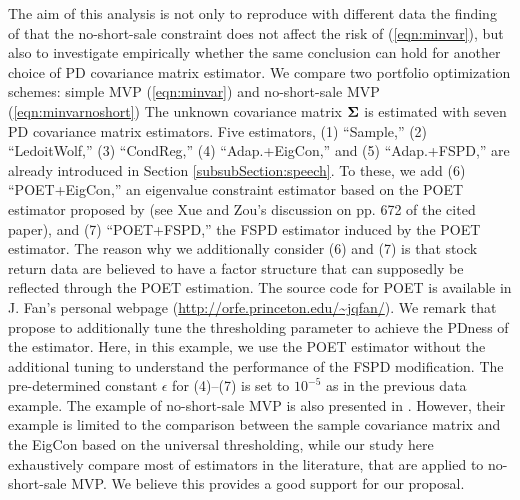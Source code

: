 \documentclass[times,sort&compress,3p]{elsarticle}
\begin{document}
The aim of this analysis is not only to reproduce with different data the finding of \citet{Jagannathan2003} that
 the no-short-sale constraint does not affect the risk of (\ref{eqn:minvar}), but also to investigate empirically whether
 the same conclusion can hold for another choice of PD covariance matrix estimator. 
We compare two portfolio optimization schemes: simple MVP (\ref{eqn:minvar}) and no-short-sale MVP
(\ref{eqn:minvarnoshort}) The unknown covariance matrix ${\bf \Sigma}$ is estimated with seven PD covariance
matrix estimators. Five estimators, (1) ``Sample,'' (2) ``LedoitWolf,'' (3) ``CondReg,'' (4) ``Adap.+EigCon,'' and
(5) ``Adap.+FSPD,'' are already introduced in Section \ref{subsubSection:speech}. To these, we add (6) ``POET+EigCon,''
an eigenvalue constraint estimator based on the POET estimator proposed by \citet{Fan2013} (see Xue and Zou's discussion on pp. 672 of the cited paper), and (7) ``POET+FSPD,'' the FSPD estimator induced by the POET estimator.
The reason why we additionally consider (6) and (7) is that stock return data are believed to have a factor structure that
can supposedly be reflected through the POET estimation. The source code for POET is available in J. Fan's personal webpage (\url{http://orfe.princeton.edu/~jqfan/}). We remark that \citet{Fan2013} propose
to additionally tune the thresholding parameter to achieve the PDness of the estimator. Here, in this example, we 
use the POET estimator without the additional tuning to understand the performance of the FSPD modification. 
The pre-determined constant $\epsilon$ for (4)--(7) is set to $10^{-5}$ as in the previous data example.
The example of no-short-sale MVP is also presented in \citet{Xue2012}. However, their example is limited 
to the comparison between the sample covariance matrix and the EigCon based on the universal thresholding, while 
our study here exhaustively compare most of estimators in the literature, that are applied to no-short-sale MVP. 
We believe this provides a good support for our proposal. 
\end{document}
